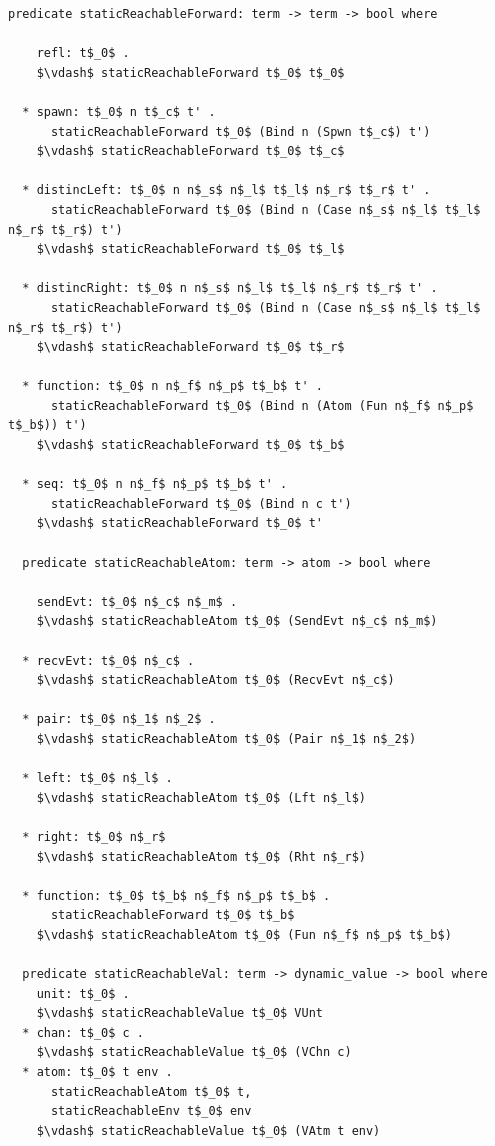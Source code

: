 \documentclass[letterpaper, 11pt]{extarticle}
\begin{document}
\begin{lstlisting}[language=logic, mathescape]
  predicate staticReachableForward: term -> term -> bool where

    refl: t$_0$ .
    $\vdash$ staticReachableForward t$_0$ t$_0$

  * spawn: t$_0$ n t$_c$ t' .
      staticReachableForward t$_0$ (Bind n (Spwn t$_c$) t')
    $\vdash$ staticReachableForward t$_0$ t$_c$

  * distincLeft: t$_0$ n n$_s$ n$_l$ t$_l$ n$_r$ t$_r$ t' .
      staticReachableForward t$_0$ (Bind n (Case n$_s$ n$_l$ t$_l$ n$_r$ t$_r$) t')
    $\vdash$ staticReachableForward t$_0$ t$_l$

  * distincRight: t$_0$ n n$_s$ n$_l$ t$_l$ n$_r$ t$_r$ t' .
      staticReachableForward t$_0$ (Bind n (Case n$_s$ n$_l$ t$_l$ n$_r$ t$_r$) t')
    $\vdash$ staticReachableForward t$_0$ t$_r$

  * function: t$_0$ n n$_f$ n$_p$ t$_b$ t' .
      staticReachableForward t$_0$ (Bind n (Atom (Fun n$_f$ n$_p$ t$_b$)) t')
    $\vdash$ staticReachableForward t$_0$ t$_b$

  * seq: t$_0$ n n$_f$ n$_p$ t$_b$ t' .
      staticReachableForward t$_0$ (Bind n c t')
    $\vdash$ staticReachableForward t$_0$ t'

  predicate staticReachableAtom: term -> atom -> bool where

    sendEvt: t$_0$ n$_c$ n$_m$ .
    $\vdash$ staticReachableAtom t$_0$ (SendEvt n$_c$ n$_m$)

  * recvEvt: t$_0$ n$_c$ .
    $\vdash$ staticReachableAtom t$_0$ (RecvEvt n$_c$)

  * pair: t$_0$ n$_1$ n$_2$ .
    $\vdash$ staticReachableAtom t$_0$ (Pair n$_1$ n$_2$)

  * left: t$_0$ n$_l$ .
    $\vdash$ staticReachableAtom t$_0$ (Lft n$_l$)

  * right: t$_0$ n$_r$
    $\vdash$ staticReachableAtom t$_0$ (Rht n$_r$)

  * function: t$_0$ t$_b$ n$_f$ n$_p$ t$_b$ . 
      staticReachableForward t$_0$ t$_b$ 
    $\vdash$ staticReachableAtom t$_0$ (Fun n$_f$ n$_p$ t$_b$)

  predicate staticReachableVal: term -> dynamic_value -> bool where
    unit: t$_0$ .
    $\vdash$ staticReachableValue t$_0$ VUnt
  * chan: t$_0$ c .
    $\vdash$ staticReachableValue t$_0$ (VChn c)
  * atom: t$_0$ t env .
      staticReachableAtom t$_0$ t, 
      staticReachableEnv t$_0$ env
    $\vdash$ staticReachableValue t$_0$ (VAtm t env)


\end{lstlisting}
\end{document}
